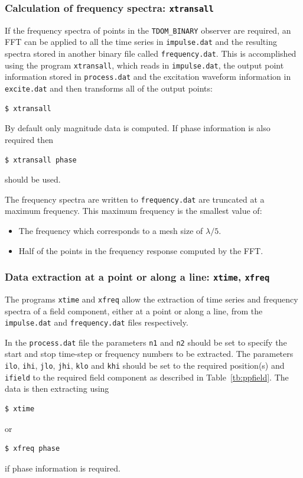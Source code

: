 \documentclass[onecolumn,a4paper]{article}
\numberwithin{equation}{section}
\begin{document}
\subsubsection{Calculation of frequency spectra: \texttt{xtransall}}

If the frequency spectra of points in the \texttt{TDOM\_BINARY} observer are required, an FFT can be applied to all the time 
series in \texttt{impulse.dat} and the resulting spectra stored in another binary file called \texttt{frequency.dat}. This
is accomplished using the program \texttt{xtransall}, which reads in \texttt{impulse.dat}, the output point 
information stored in \texttt{process.dat} and the excitation waveform information in \texttt{excite.dat} and 
then transforms all of the output points:
\begin{verbatim}
$ xtransall
\end{verbatim}
By default only magnitude data is computed. If phase information is also required then 
\begin{verbatim}
$ xtransall phase
\end{verbatim}
should be used.

The frequency spectra are written to \texttt{frequency.dat} are truncated at a maximum frequency. This maximum 
frequency is the smallest value of:
\begin{itemize}
 \item The frequency which corresponds to a mesh size of $\lambda/5$.
 \item Half of the points in the frequency response computed by the FFT.
\end{itemize}

\subsubsection{Data extraction at a point or along a line: \texttt{xtime}, \texttt{xfreq}}

The programs \texttt{xtime} and \texttt{xfreq} allow the extraction of time series and frequency spectra
of a field component, either at a point or along a line, from the \texttt{impulse.dat} and \texttt{frequency.dat} files respectively.

In the \texttt{process.dat} file the parameters \texttt{n1} and \texttt{n2} should be set to specify the start and stop 
time-step or frequency numbers to be extracted. The parameters \texttt{ilo}, \texttt{ihi}, \texttt{jlo}, \texttt{jhi}, \texttt{klo}
and \texttt{khi} should be set to the required position(s) and \texttt{ifield} to the required field component as described in 
Table~\ref{tb:ppfield}. The data is then extracting using
\begin{verbatim}
$ xtime
\end{verbatim}
or
\begin{verbatim}
$ xfreq phase
\end{verbatim}
if phase information is required.
\end{document}
